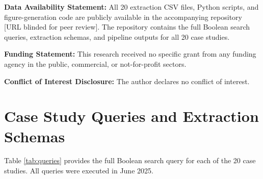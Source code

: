 \documentclass[12pt]{article}
\begin{document}
\textbf{Data Availability Statement:}
All 20 extraction CSV files, Python scripts, and figure-generation code are publicly available in the accompanying repository [URL blinded for peer review]. The repository contains the full Boolean search queries, extraction schemas, and pipeline outputs for all 20 case studies.

\textbf{Funding Statement:}
This research received no specific grant from any funding agency in the public, commercial, or not-for-profit sectors.

\textbf{Conflict of Interest Disclosure:}
The author declares no conflict of interest.

\appendix

\section{Case Study Queries and Extraction Schemas}
\label{app:queries}

Table \ref{tab:queries} provides the full Boolean search query for each of the 20 case studies. All queries were executed in June 2025.
\end{document}
